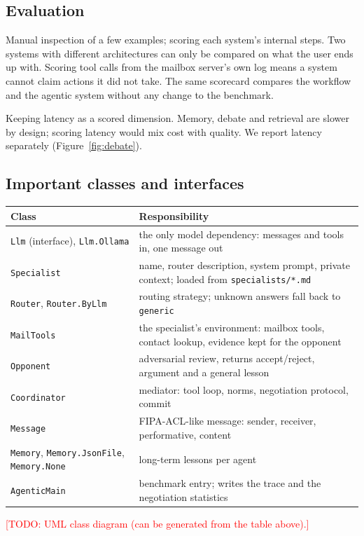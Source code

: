 \documentclass[11pt,a4paper]{article}
\newcommand{\code}[1]{\texttt{#1}}
\newcommand{\todo}[1]{\textcolor{red}{[TODO: #1]}}
\begin{document}
\subsection{Evaluation}
{Manual inspection of a few examples; scoring each system's internal steps.}
{Two systems with different architectures can only be compared on what the user ends up with. Scoring tool calls
from the mailbox server's own log means a system cannot claim actions it did not take.}
{The same scorecard compares the workflow and the agentic system without any change to the benchmark.}

{Keeping latency as a scored dimension.}
{Memory, debate and retrieval are slower by design; scoring latency would mix cost with quality. We report latency
separately (Figure~\ref{fig:debate}).}
{}

\subsection{Important classes and interfaces}
\begin{center}
\begin{tabularx}{\linewidth}{lX}
\toprule
Class & Responsibility \\
\midrule
\code{Llm} (interface), \code{Llm.Ollama} & the only model dependency: messages and tools in, one message out \\
\code{Specialist} & name, router description, system prompt, private context; loaded from \code{specialists/*.md} \\
\code{Router}, \code{Router.ByLlm} & routing strategy; unknown answers fall back to \code{generic} \\
\code{MailTools} & the specialist's environment: mailbox tools, contact lookup, evidence kept for the opponent \\
\code{Opponent} & adversarial review, returns accept/reject, argument and a general lesson \\
\code{Coordinator} & mediator: tool loop, norms, negotiation protocol, commit \\
\code{Message} & FIPA-ACL-like message: sender, receiver, performative, content \\
\code{Memory}, \code{Memory.JsonFile}, \code{Memory.None} & long-term lessons per agent \\
\code{AgenticMain} & benchmark entry; writes the trace and the negotiation statistics \\
\bottomrule
\end{tabularx}
\end{center}
\todo{UML class diagram (can be generated from the table above).}
\end{document}
